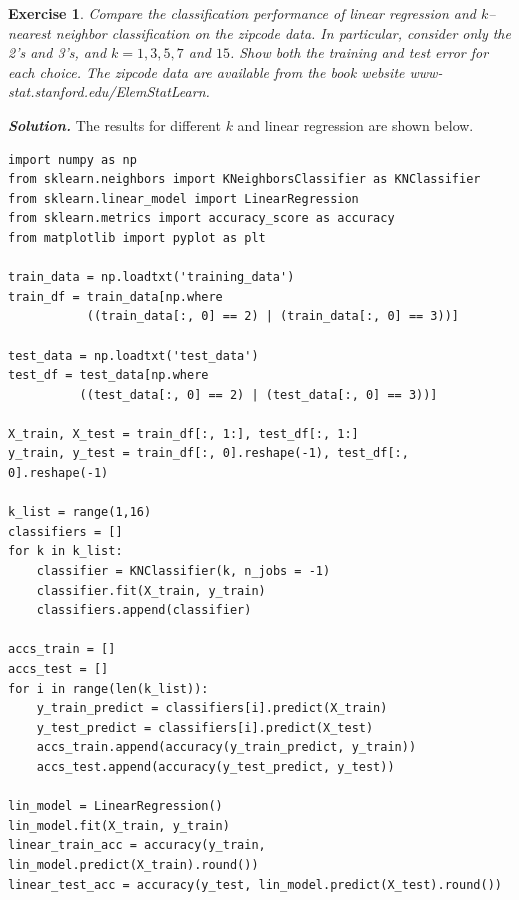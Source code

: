 \documentclass[12pt]{article}
\newtheorem{exercise}{Exercise}[section]
\newenvironment{solution}[1][\it{Solution}]{\textbf{#1. } }{\vspace{.5cm}}
\begin{document}
\begin{exercise}Compare the classification performance of linear regression and $k$–
nearest neighbor classification on the zipcode data. In particular, consider
only the 2’s and 3’s, and $k = 1, 3, 5, 7$ and $15$. Show both the training and
test error for each choice. The zipcode data are available from the book
website www-stat.stanford.edu/ElemStatLearn.
\end{exercise}
\begin{solution}
    The results for different $k$ and linear regression are shown below. 

\vspace{.5cm}
\begin{tcolorbox}[width=\linewidth, sharp corners=all, colback=white!95!black]

    \begin{verbatim}
import numpy as np
from sklearn.neighbors import KNeighborsClassifier as KNClassifier
from sklearn.linear_model import LinearRegression
from sklearn.metrics import accuracy_score as accuracy
from matplotlib import pyplot as plt

train_data = np.loadtxt('training_data')
train_df = train_data[np.where
           ((train_data[:, 0] == 2) | (train_data[:, 0] == 3))]

test_data = np.loadtxt('test_data')
test_df = test_data[np.where
          ((test_data[:, 0] == 2) | (test_data[:, 0] == 3))]

X_train, X_test = train_df[:, 1:], test_df[:, 1:]
y_train, y_test = train_df[:, 0].reshape(-1), test_df[:, 0].reshape(-1)

k_list = range(1,16)
classifiers = []
for k in k_list:
    classifier = KNClassifier(k, n_jobs = -1)
    classifier.fit(X_train, y_train)
    classifiers.append(classifier)

accs_train = []
accs_test = []
for i in range(len(k_list)):
    y_train_predict = classifiers[i].predict(X_train)
    y_test_predict = classifiers[i].predict(X_test)
    accs_train.append(accuracy(y_train_predict, y_train))
    accs_test.append(accuracy(y_test_predict, y_test))

lin_model = LinearRegression()
lin_model.fit(X_train, y_train)
linear_train_acc = accuracy(y_train, lin_model.predict(X_train).round())
linear_test_acc = accuracy(y_test, lin_model.predict(X_test).round())
\end{verbatim}
\end{tcolorbox}
\newpage

\begin{tcolorbox}[width=\linewidth, sharp corners=all, colback=white!95!black]


\end{tcolorbox}
\end{solution}
\end{document}
